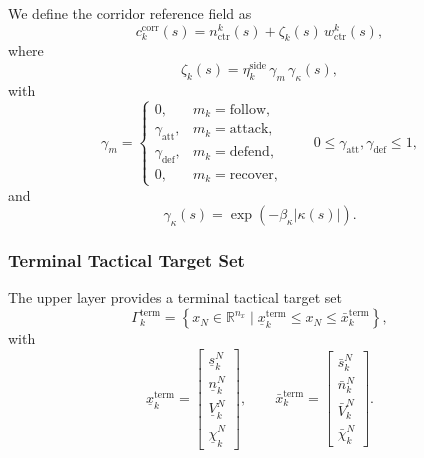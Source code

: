 \documentclass[final ,3p, times]{elsarticle}
\begin{document}
We define the corridor reference field as
\begin{equation}
c_k^{\mathrm{corr}}(s)
=
n_{\mathrm{ctr}}^k(s)
+
\zeta_k(s)\,w_{\mathrm{ctr}}^k(s),
\label{eq:corridor_reference_field_instantiated}
\end{equation}
where
\begin{equation}
\zeta_k(s)
=
\eta_k^{\mathrm{side}}
\,
\gamma_m
\,
\gamma_\kappa(s),
\label{eq:zeta_definition}
\end{equation}
with
\begin{equation}
\gamma_m=
\begin{cases}
0, & m_k=\mathrm{follow},\\
\gamma_{\mathrm{att}}, & m_k=\mathrm{attack},\\
\gamma_{\mathrm{def}}, & m_k=\mathrm{defend},\\
0, & m_k=\mathrm{recover},
\end{cases}
\qquad
0 \le \gamma_{\mathrm{att}},\gamma_{\mathrm{def}} \le 1,
\label{eq:mode_dependent_gamma}
\end{equation}
and
\begin{equation}
\gamma_\kappa(s)
=
\exp\!\left(
-\beta_\kappa |\kappa(s)|
\right).
\label{eq:curvature_modulation}
\end{equation}

\subsubsection{Terminal Tactical Target Set}

The upper layer provides a terminal tactical target set
\begin{equation}
\Gamma_k^{\mathrm{term}}
=
\left\{
x_N \in \mathbb{R}^{n_x}
\mid
\underline x_k^{\mathrm{term}}
\le x_N \le
\bar x_k^{\mathrm{term}}
\right\},
\label{eq:terminal_target_set_repeated}
\end{equation}
with
\begin{equation}
\underline x_k^{\mathrm{term}}
=
\begin{bmatrix}
\underline s_k^{N}\\
\underline n_k^{N}\\
\underline V_k^{N}\\
\underline \chi_k^{N}
\end{bmatrix},
\qquad
\bar x_k^{\mathrm{term}}
=
\begin{bmatrix}
\bar s_k^{N}\\
\bar n_k^{N}\\
\bar V_k^{N}\\
\bar \chi_k^{N}
\end{bmatrix}.
\label{eq:terminal_bounds}
\end{equation}
\end{document}
